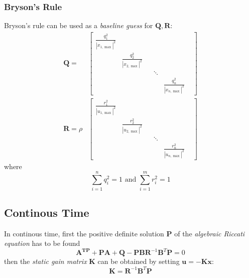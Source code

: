 \subsubsection{Bryson's Rule}
Bryson's rule can be used as a \textit{baseline guess} for $\mathbf{Q,R}$:
\noindent\begin{align*}
    \mathbf{Q} =
     & \begin{bmatrix}\frac{q_1^2}{|x_{1,\max}|^2} &                              &  &        &                              & \\
                                            & \frac{q_2^2}{|x_{2,\max}|^2} &  &        &                              & \\
                                            &                              &  & \ddots &                              & \\
                                            &                              &  &        & \frac{q_n^2}{|x_{n,\max}|^2}
       \end{bmatrix} \\
    \mathbf{R} = \rho
     & \begin{bmatrix}\frac{r_1^2}{|u_{1,\max}|^2} &                              &  &        &                              & \\
                                            & \frac{r_2^2}{|u_{2,\max}|^2} &  &        &                              & \\
                                            &                              &  & \ddots &                              & \\
                                            &                              &  &        & \frac{r_n^2}{|u_{n,\max}|^2}
       \end{bmatrix}
\end{align*}
where
\noindent\begin{equation*}
    \sum_{i=1}^n q_i^2=1\text{ and }\sum_{i=1}^m r_i^2=1
\end{equation*}

\subsection{Continous Time}
In continous time, first the positive definite solution $\mathbf{P}$ of the \textit{algebraic Riccati equation} has to be found
\noindent\begin{equation*}
    \mathbf{A}^\mathbf{TP}+\mathbf{PA}+\mathbf{Q}-\mathbf{PBR}^{-1}\mathbf{B}^T \mathbf{P}=0
\end{equation*}
then the \textit{static gain matrix} $\mathbf{K}$ can be obtained by setting $\mathbf{u} = -\mathbf{Kx}$:
\noindent\begin{equation*}
    \mathbf{K}=\mathbf{R}^{-1}\mathbf{B}^T \mathbf{P}
\end{equation*}


